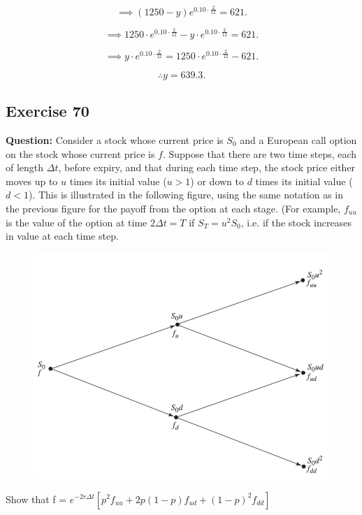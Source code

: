 \documentclass{article}
\begin{document}
\[
\implies (1250 - y)e^{0.10 \cdot \frac{2}{12}} = 621.
\]

\[
\implies 1250 \cdot e^{0.10 \cdot \frac{2}{12}} - y \cdot e^{0.10 \cdot \frac{2}{12}} = 621.
\]

\[
\implies y \cdot e^{0.10 \cdot \frac{2}{12}} = 1250 \cdot e^{0.10 \cdot \frac{2}{12}} - 621.
\]

\[
\therefore y = 639.3.
\]

\subsection*{Exercise 70}
\textbf{Question:} Consider a stock whose current price is $S_0$ and a European call option on the stock whose current price is $f$.  Suppose that there are two time steps, each of length $\Delta t$, before expiry, and that during each time step, the stock price either moves up to $u$ times its initial value ($u>1$) or down to $d$ times its initial value ($d<1$).  This is illustrated in the following figure, using the same notation as in the previous figure for the payoff from the option at each stage.  (For example, $f_{uu}$ is the value of the option at time $2\Delta t=T$ if $S_T=u^2S_0$, i.e. if the stock increases in value at each time step.

\begin{center}
\begin{figure}[h]
\includegraphics[scale=0.7]{p1.png}
\end{figure}
\end{center}
Show that
f = $e^{-2r \Delta t} [p^{2}f_{uu} + 2p(1 - p)f_{ud} + (1 - p)^{2}f_{dd}]$
\end{document}
